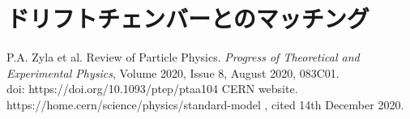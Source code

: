 \documentclass[report]{jsbook}
\begin{document}
\section{ドリフトチェンバーとのマッチング}

\begin{thebibliography}{99}
 P.A. Zyla et al. Review of Particle Physics.  {\it Progress of Theoretical and Experimental Physics}, Volume 2020, Issue 8, August 2020, 083C01. \\
doi: https://doi.org/10.1093/ptep/ptaa104
 CERN website. https://home.cern/science/physics/standard-model , cited 14th December 2020.
\end{thebibliography}


\begin{comment}
・文献の引用の仕方

データは参考文献\cite{rika} にあったものを使った．
この文献\cite{ten}も参考にした。

・図の挿入の仕方
\begin{figure}[h]
\begin{center}
\texttt{[image: ./plot1.pdf]}
\caption{サイン関数のグラフ}
\end{center}
\end{figure}


\begin{verbatim}
#include <iostream>
using namespace std;
int main() {
for(int i = 1; i <= 5; i++) {
cout << "こんにちは" << i << endl;
}
return 0;
}
\end{verbatim}
\verb|\usepackage{ascmac}|して\verb|screen| 環境を使うと，枠がつきます。
\begin{screen}
\begin{verbatim}
#include <iostream>
using namespace std;
int main() {
for(int i = 1; i <= 5; i++) {
cout << "こんにちは" << i << endl;
}
return 0;
}
\end{verbatim}
\end{screen}

\begin{thebibliography}{99}
\bibitem{rika} 国立天文台編，理科年表 (丸善)
\bibitem{ten} 天文年鑑，誠文堂新光社。
\end{thebibliography}

\end{comment}
\end{document}
